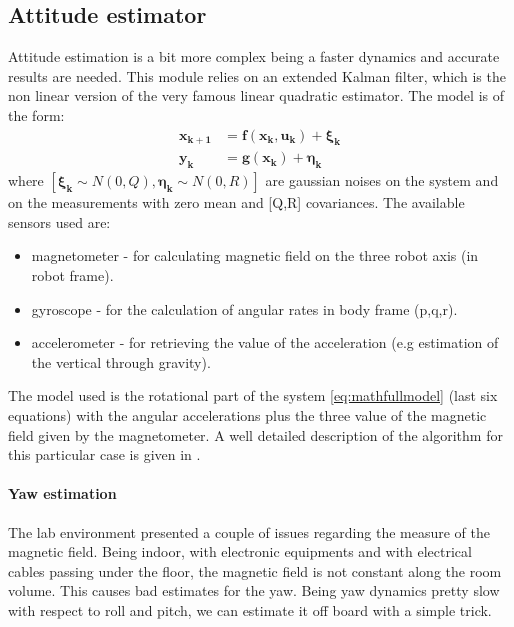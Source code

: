 \subsection{Attitude estimator}

Attitude estimation is a bit more complex being a faster dynamics and accurate results are needed. This module relies on an extended Kalman filter, which is the non linear version of the very famous linear quadratic estimator. The model is of the form:
\begin{equation}
	\begin{aligned}
	\boldsymbol{x_{k+1}}& = \boldsymbol{f(\boldsymbol{x_k}, \boldsymbol{u_k})} + \boldsymbol{\xi_k} \\
	\boldsymbol{y_k}& = \boldsymbol{ g(\boldsymbol{x_k}) } + \boldsymbol{\eta_k}
	\end{aligned}
\end{equation}
where $[\boldsymbol{\xi_k} \sim N(0,Q), \boldsymbol{\eta_k} \sim N(0,R) ]$ are gaussian noises on the system and on the measurements with zero mean and [Q,R] covariances. The available sensors used are: \begin{itemize}
	\item magnetometer - for calculating magnetic field on the three robot axis (in robot frame).
	\item gyroscope - for the calculation of angular rates in body frame (p,q,r).
	\item accelerometer - for retrieving the value of the acceleration (e.g estimation of the vertical through gravity).
	\end{itemize}

\noindent
The model used is the rotational part of the system \eqref{eq:mathfullmodel} (last six equations) with the angular accelerations plus the three value of the magnetic field given by the magnetometer. A well detailed description of the algorithm for this particular case is given in \cite{attekf}.

\noindent
\paragraph{Yaw estimation} The lab environment presented a couple of issues regarding the measure of the magnetic field. Being indoor, with electronic equipments and with electrical cables passing under the floor, the magnetic field is not constant along the room volume. This causes bad estimates for the yaw. Being yaw dynamics pretty slow with respect to roll and pitch, we can estimate it off board with a simple trick.\\

